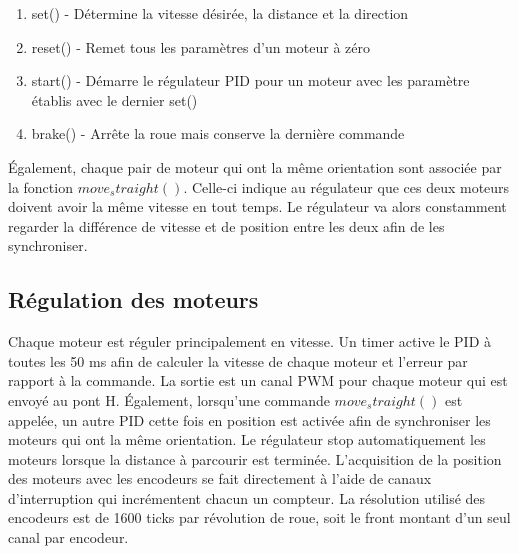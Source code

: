 \begin{enumerate}
\item set() - Détermine la vitesse désirée, la distance et la direction
\item reset() - Remet tous les paramètres d’un moteur à zéro
\item start() - Démarre le régulateur PID pour un moteur avec les paramètre établis avec le dernier set()
\item brake() - Arrête la roue mais conserve la dernière commande
\end{enumerate}

Également, chaque pair de moteur qui ont la même orientation sont associée par la fonction $move_straight()$. Celle-ci indique au régulateur que ces deux moteurs doivent avoir la même vitesse en tout temps. Le régulateur va alors constamment regarder la différence de vitesse et de position entre les deux afin de les synchroniser.

\subsection{Régulation des moteurs}

Chaque moteur est réguler principalement en vitesse. Un timer active le PID à toutes les 50 ms afin de calculer la vitesse de chaque moteur et l’erreur par rapport à la commande. La sortie est un canal PWM pour chaque moteur qui est envoyé au pont H. Également, lorsqu’une commande $move_straight()$ est appelée, un autre PID cette fois en position est activée afin de synchroniser les moteurs qui ont la même orientation. Le régulateur stop automatiquement les moteurs lorsque la distance à parcourir est terminée. L'acquisition de la position des moteurs avec les encodeurs se fait directement à l’aide de canaux d’interruption qui incrémentent chacun un compteur. La résolution utilisé des encodeurs est de 1600 ticks par révolution de roue, soit le front montant d’un seul canal par encodeur.

